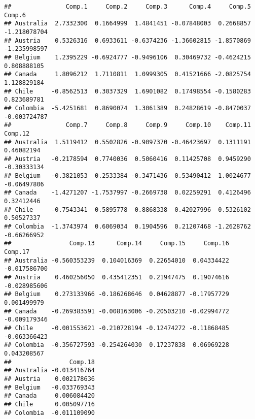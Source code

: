 \documentclass[
]{article}
\newenvironment{Shaded}{\begin{snugshade}}{\end{snugshade}}
\newcommand{\CommentTok}[1]{\textcolor[rgb]{0.56,0.35,0.01}{\textit{#1}}}
\newcommand{\DecValTok}[1]{\textcolor[rgb]{0.00,0.00,0.81}{#1}}
\newcommand{\DocumentationTok}[1]{\textcolor[rgb]{0.56,0.35,0.01}{\textbf{\textit{#1}}}}
\newcommand{\FunctionTok}[1]{\textcolor[rgb]{0.13,0.29,0.53}{\textbf{#1}}}
\newcommand{\NormalTok}[1]{#1}
\newcommand{\SpecialCharTok}[1]{\textcolor[rgb]{0.81,0.36,0.00}{\textbf{#1}}}
\begin{document}
\begin{verbatim}
##               Comp.1     Comp.2     Comp.3      Comp.4     Comp.5       Comp.6
## Australia  2.7332300  0.1664999  1.4841451 -0.07848003  0.2668857 -1.218078704
## Austria    0.5326316  0.6933611 -0.6374236 -1.36602815 -1.8570869 -1.235998597
## Belgium    1.2395229 -0.6924777 -0.9496106  0.30469732 -0.4624215  0.808888105
## Canada     1.8096212  1.7110811  1.0999305  0.41521666 -2.0825754  1.128829184
## Chile     -0.8562513  0.3037329  1.6901082  0.17498554 -0.1580283  0.823689781
## Colombia  -5.4251681  0.8690074  1.3061389  0.24828619 -0.8470037 -0.003724787
##               Comp.7     Comp.8     Comp.9     Comp.10    Comp.11     Comp.12
## Australia  1.5119412  0.5502826 -0.9097370 -0.46423697  0.1311191  0.46082194
## Austria   -0.2178594  0.7740036  0.5060416  0.11425708  0.9459290 -0.30333134
## Belgium   -0.3821053  0.2533384 -0.3471436  0.53490412  1.0024677 -0.06497806
## Canada    -1.4271207 -1.7537997 -0.2669738  0.02259291  0.4126496  0.32412446
## Chile     -0.7543341  0.5895778  0.8868338  0.42027996  0.5326102  0.50527337
## Colombia  -1.3743974  0.6069034  0.1904596  0.21207468 -1.2628762 -0.66266952
##                Comp.13      Comp.14     Comp.15     Comp.16      Comp.17
## Australia -0.560353239  0.104016369  0.22654010  0.04334422 -0.017586700
## Austria    0.460256050  0.435412351  0.21947475  0.19074616 -0.028985606
## Belgium    0.273133966 -0.186268646  0.04628877 -0.17957729  0.001499979
## Canada    -0.269383591 -0.008163006 -0.20503210 -0.02994772 -0.009179346
## Chile     -0.001553621 -0.210728194 -0.12474272 -0.11868485 -0.063366423
## Colombia  -0.356727593 -0.254264030  0.17237838  0.06969228  0.043208567
##                Comp.18
## Australia -0.013416764
## Austria    0.002178636
## Belgium   -0.033769343
## Canada     0.006084420
## Chile      0.005097716
## Colombia  -0.011109090
\end{verbatim}

\begin{Shaded}
\end{Shaded}
\end{document}

